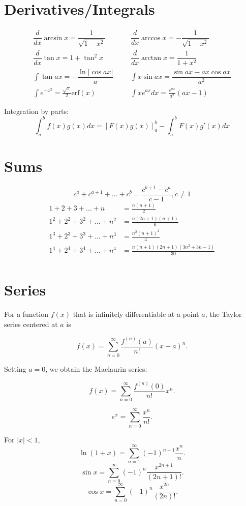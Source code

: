 \section{Derivatives/Integrals}
\begin{align*}
	\dfrac{d}{dx}\arcsin x = \dfrac{1}{\sqrt{1-x^2}} &&& \dfrac{d}{dx}\arccos x = -\dfrac{1}{\sqrt{1-x^2}} \\
	\dfrac{d}{dx}\tan x = 1+\tan^2 x &&& \dfrac{d}{dx}\arctan x = \dfrac{1}{1+x^2} \\
	\int\tan ax = -\dfrac{\ln|\cos ax|}{a} &&& \int x\sin ax = \dfrac{\sin ax-ax \cos ax}{a^2} \\
	\int e^{-x^2} = \frac{\sqrt \pi}{2} \text{erf}(x) &&& \int xe^{ax}dx = \frac{e^{ax}}{a^2}(ax-1)
\end{align*}

Integration by parts:
\[\int_a^bf(x)g(x)dx = [F(x)g(x)]_a^b-\int_a^bF(x)g'(x)dx\]

\section{Sums}
\[ c^a + c^{a+1} + \dots + c^{b} = \frac{c^{b+1} - c^a}{c-1}, c \neq 1 \]
\begin{align*}
	1 + 2 + 3 + \dots + n &= \frac{n(n+1)}{2} \\
	1^2 + 2^2 + 3^2 + \dots + n^2 &= \frac{n(2n+1)(n+1)}{6} \\
	1^3 + 2^3 + 3^3 + \dots + n^3 &= \frac{n^2(n+1)^2}{4} \\
	1^4 + 2^4 + 3^4 + \dots + n^4 &= \frac{n(n+1)(2n+1)(3n^2 + 3n - 1)}{30} \\
\end{align*}

\section{Series}
For a function \(f(x)\) that is infinitely differentiable at a point \(a\),
the Taylor series centered at \(a\) is

\[
f(x) = \sum_{n=0}^\infty 
       \frac{f^{(n)}(a)}{n!}(x-a)^n.
\]

Setting \(a = 0\), we obtain the Maclaurin series:

\[
f(x) = \sum_{n=0}^{\infty} 
       \frac{f^{(n)}(0)}{n!} x^n.
\]

\[
e^{x} = \sum_{n=0}^{\infty} \frac{x^n}{n!}.
\]

For \(|x| < 1\),
\[
\ln(1+x) = \sum_{n=1}^{\infty} 
           (-1)^{n-1} \frac{x^n}{n}.
\]\[
\sin x = \sum_{n=0}^{\infty} (-1)^n 
         \frac{x^{2n+1}}{(2n+1)!}.
\]
\[
\cos x = \sum_{n=0}^{\infty} (-1)^n 
         \frac{x^{2n}}{(2n)!}.
\]

